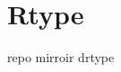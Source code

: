 \chapter{Rtype}
\hypertarget{md_README}{}\label{md_README}
\label{md_README_autotoc_md7603}%
%
repo mirroir d\textquotesingle{}rtype 